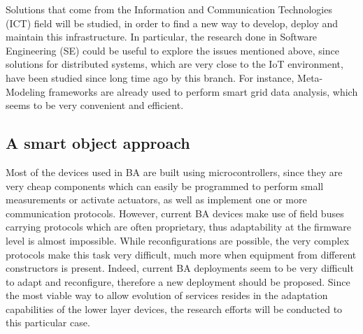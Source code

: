 
Solutions that come from the Information and Communication Technologies (ICT) field will be studied, in order to find a new way to develop, deploy and maintain this infrastructure.
In particular, the research done in Software Engineering (SE) could be useful to explore the issues mentioned above, since solutions for distributed systems, which are very close to the IoT environment, have been studied since long time ago by this branch.
For instance, Meta-Modeling frameworks are already used to perform smart grid data analysis\cite{hartmann2014realisticsmartgrid}, which seems to be very convenient and efficient.

\subsection{A smart object approach}
Most of the devices used in BA are built using microcontrollers, since they are very cheap components which can easily be programmed to perform small measurements or activate actuators, as well as implement one or more communication protocols.
However, current BA devices make use of field buses carrying protocols which are often proprietary, thus adaptability at the firmware level is almost impossible.
While reconfigurations are possible, the very complex protocols make this task very difficult, much more when equipment from different constructors is present.
Indeed, current BA deployments seem to be very difficult to adapt and reconfigure, therefore a new deployment should be proposed.
Since the most viable way to allow evolution of services resides in the adaptation capabilities of the lower layer devices, the research efforts will be conducted to this particular case.


